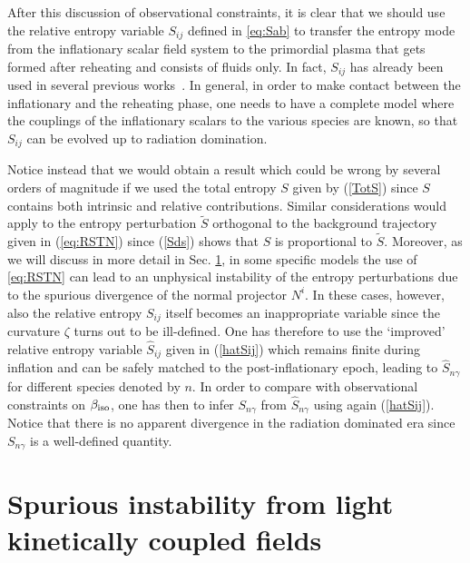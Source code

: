 \documentclass[a4paper,11pt]{article}
\begin{document}
After this discussion of observational constraints, it is clear that we should use the relative entropy variable $S_{ij}$ defined in \eqref{eq:Sab} to transfer the entropy mode from the inflationary scalar field system to the primordial plasma that gets formed after reheating and consists of fluids only. In fact, $S_{ij}$ has already been used in several previous works~\cite{Polarski:1994rz, Langlois:1999dw, Bartolo:2001rt}. In general, in order to make contact between the inflationary and the reheating phase, one needs to have a complete model where the couplings of the inflationary scalars to the various species are known, so that $S_{ij}$ can be evolved up to radiation domination.

Notice instead that we would obtain a result which could be wrong by several orders of magnitude if we used the total entropy $S$ given by (\ref{TotS}) \cite{Huston:2011fr, Huston:2013kgl} since $S$ contains both intrinsic and relative contributions. Similar considerations would apply to the entropy perturbation $\tilde S$ orthogonal to the background trajectory given in (\ref{eq:RSTN}) since (\ref{Sds}) shows that $S$ is proportional to $\tilde S$. Moreover, as we will discuss in more detail in Sec. \ref{sec:SpuriousInstability}, in some specific models \cite{Wands:2000dp,Cicoli:2018ccr, Cicoli:2019ulk} the use of \eqref{eq:RSTN} can lead to an unphysical instability of the entropy perturbations due to the spurious divergence of the normal projector $N^i$. In these cases, however, also the relative entropy $S_{ij}$ itself becomes an inappropriate variable since the curvature $\zeta$ turns out to be ill-defined. One has therefore to use the `improved' relative entropy variable $\hat{S}_{ij}$ given in (\ref{hatSij}) which remains finite during inflation and can be safely matched to the post-inflationary epoch, leading to $\hat{S}_{n\gamma}$ for different species denoted by $n$. In order to compare with observational constraints on $\beta_{\rm iso}$, one has then to infer $S_{n\gamma}$ from $\hat{S}_{n\gamma}$ using again (\ref{hatSij}). Notice that there is no apparent divergence in the radiation dominated era since $S_{n\gamma}$ is a well-defined quantity. 



\section{Spurious instability from light kinetically coupled fields}
\label{sec:SpuriousInstability}
\end{document}
